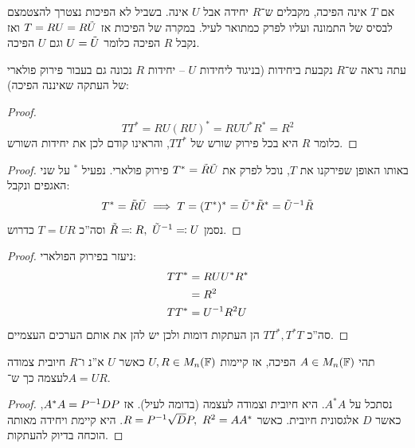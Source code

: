 \documentclass[name=רשימות אלגברה לינארית 2א]{../../../tex/classes/megasumPreamble}
\begin{document}
	\begin{Remark}
		אם $T$ אינה הפיכה, מקבלים ש־$R$ יחידה אבל $U$ אינה. בשביל לא הפיכות נצטרך להצטמצם לבסיס של התמונה ועליו לפרק כמתואר לעיל. במקרה של הפיכות אז $T = RU = R \tl U$ ואז נקבל $R$ הפיכה כלומר $U = \tl U$ וגם $U$ הפיכה. 
	\end{Remark}
	
	עתה נראה ש־$R$ נקבעת ביחידות (בניגוד ליחידות $U$ – יחידות $R$ נכונה גם בעבור פירוק פולארי של העתקה שאיננה הפיכה): 
	\begin{proof}
		\[ TT^* = RU(RU)^* = RUU^*R^* = R^2 \]
		כלומר $R$ היא בכל פירוק שורש של $TT^*$, והראינו קודם לכן את יחידות השורש. 
	\end{proof}
	\begin{proof}
		באותו האופן שפירקנו את $T$, נוכל לפרק את $T^* = \tl R \tl U$ פירוק פולארי. נפעיל $^*$ על שני האגפים ונקבל: 
		\[ T^* =\tl R \tl U \implies T = (T^*)^* = \tl U^*\tl R^* = \tl U\op \tl R \]
		נסמן $\tl R \doc R, \ \tl U\op \doc U$ וסה''כ $T = UR$ כדרוש. 
	\end{proof}
	\begin{proof}ניעזר בפירוק הפולארי: 
		\begin{align*}
			TT^* &= RUU^*R^* \\
			&= R^2 \\
			TT^* &= U\op R^2U
		\end{align*}
		סה''כ $TT^*, T^*T$ הן העתקות דומות ולכן יש להן את אותם הערכים העצמיים. 
	\end{proof}
	
	
	
	\begin{Theorem}
		תהי $A \in M_n(\F)$ הפיכה, אז קיימות $U, R \in M_n(\F)$ כאשר $U$ א''נ ו־$R$ חיובית צמודה לעצמה כך ש־$A = UR$. 
	\end{Theorem}
	\begin{proof}
		נסתכל על $A^*A$. היא חיובית וצמודה לעצמה (בדומה לעיל). אז $A^*A = P\op D P$, כאשר $D$ אלגסונית חיובית. כאשר $R = P\op \sqrt D P, \ R^2 = AA^*$. היא קיימת ויחידה מאותה הוכחה בדיוק להעתקות. 
	\end{proof}
	
\end{document}

